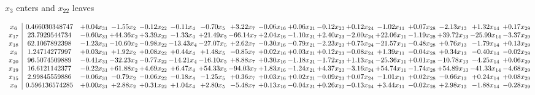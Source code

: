 \documentclass[9pt]{article}
\begin{document}
 $ x_{3} $ enters and $ x_{22} $ leaves 

 \[\begin{array}{c| c c@{\hskip 2pt} c@{\hskip 2pt} c@{\hskip 2pt} c@{\hskip 2pt} c@{\hskip 2pt} c@{\hskip 2pt} c@{\hskip 2pt} c@{\hskip 2pt} c@{\hskip 2pt} c@{\hskip 2pt} c@{\hskip 2pt} c@{\hskip 2pt} c@{\hskip 2pt} c@{\hskip 2pt} c@{\hskip 2pt} }
 x_{6}   &  0.466030348747 & +  0.04 x_{31} & -1.55 x_{2} & -0.12 x_{22} & -0.11 x_{4} & -0.70 x_{5} & +  3.22 x_{7} & -0.06 x_{16} & +  0.06 x_{21} & -0.12 x_{23} & +  0.12 x_{24} & -1.02 x_{11} & +  0.07 x_{28} & -2.13 x_{13} & +  1.32 x_{14} & +  0.17 x_{29}\\
 x_{17}   &  23.7929544734 & -0.60 x_{31} & + 44.36 x_{2} & +  3.39 x_{22} & -1.33 x_{4} & + 21.49 x_{5} & -66.14 x_{7} & +  2.04 x_{16} & -1.10 x_{21} & +  2.40 x_{23} & -2.00 x_{24} & + 22.06 x_{11} & -1.19 x_{28} & + 39.72 x_{13} & -25.99 x_{14} & -3.37 x_{29}\\
 x_{18}   &  62.1067892398 & -1.23 x_{31} & -10.60 x_{2} & -0.98 x_{22} & -13.43 x_{4} & -27.07 x_{5} & +  2.62 x_{7} & -0.30 x_{16} & -0.79 x_{21} & -2.23 x_{23} & +  0.75 x_{24} & -21.57 x_{11} & -0.48 x_{28} & +  0.76 x_{13} & -1.79 x_{14} & +  0.13 x_{29}\\
 x_{8}   &  1.24714277997 & +  0.03 x_{31} & +  1.92 x_{2} & +  0.08 x_{22} & +  0.44 x_{4} & +  1.48 x_{5} & -0.85 x_{7} & +  0.02 x_{16} & +  0.03 x_{21} & +  0.12 x_{23} & -0.08 x_{24} & +  1.39 x_{11} & -0.04 x_{28} & +  0.34 x_{13} & -0.40 x_{14} & -0.02 x_{29}\\
 x_{20}   &  96.5074509889 & -0.41 x_{31} & -32.23 x_{2} & -0.77 x_{22} & -14.21 x_{4} & -16.10 x_{5} & +  8.88 x_{7} & +  0.30 x_{16} & -1.18 x_{21} & -1.72 x_{23} & +  1.13 x_{24} & -25.36 x_{11} & +  0.01 x_{28} & -10.78 x_{13} & -4.25 x_{14} & +  0.06 x_{29}\\
 x_{19}   &  16.6121142377 & -0.22 x_{31} & + 61.88 x_{2} & +  4.69 x_{22} & +  6.47 x_{4} & + 54.33 x_{5} & -94.03 x_{7} & +  1.83 x_{16} & -1.24 x_{21} & +  4.37 x_{23} & -3.16 x_{24} & + 54.74 x_{11} & -1.74 x_{28} & + 54.89 x_{13} & -41.33 x_{14} & -4.68 x_{29}\\
 x_{15}   &  2.99845559886 & -0.06 x_{31} & -0.79 x_{2} & -0.06 x_{22} & -0.18 x_{4} & -1.25 x_{5} & +  0.36 x_{7} & +  0.03 x_{16} & +  0.02 x_{21} & -0.09 x_{23} & +  0.07 x_{24} & -1.01 x_{11} & +  0.02 x_{28} & -0.66 x_{13} & +  0.24 x_{14} & +  0.08 x_{29}\\
 x_{9}   &  0.596136574285 & +  0.00 x_{31} & +  2.88 x_{2} & +  0.31 x_{22} & +  1.04 x_{4} & +  2.80 x_{5} & -5.48 x_{7} & +  0.13 x_{16} & -0.04 x_{21} & +  0.26 x_{23} & -0.13 x_{24} & +  3.44 x_{11} & -0.02 x_{28} & +  2.98 x_{13} & -1.88 x_{14} & -0.28 x_{29}\\

\end{array}\]
\end{document}
